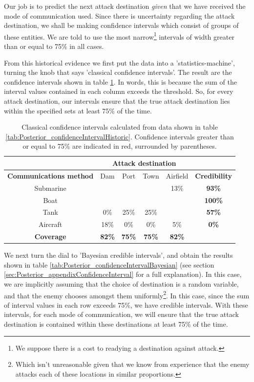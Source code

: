 \documentclass[11pt,fullpage]{book}
\begin{document}
Our job is to predict the next attack destination \textit{given} that we have received the mode of communication used. Since there is uncertainty regarding the attack destination, we shall be making confidence intervals which consist of groups of these entities. We are told to use the most narrow\footnote{We suppose there is a cost to readying a destination against attack.} intervals of width greater than or equal to 75\% in all cases.

From this historical evidence we first put the data into a 'statistics-machine', turning the knob that says 'classical confidence intervals'. The result are the confidence intervals shown in table \ref{tab:Posterior_confidenceIntervalClassical}. In words, this is because the sum of the interval values contained in each column exceeds the threshold. So, for every attack destination, our intervals ensure that the true attack destination lies within the specified sets at least 75\% of the time.

\begin{table}[htbp]
  \centering
    \begin{tabular}{cccccc}
    \toprule
          & \multicolumn{4}{c}{\textbf{Attack destination}} & \multicolumn{1}{c}{\textbf{}} \\
    \midrule
    \textbf{Communications method} & Dam & Port & Town & Airfield   & \textbf{Credibility} \\
    Submarine & \color{red}{$[$73\%}  & \color{red}{50\%}  & \color{red}{50\%$]$}  & 13\%  & \textbf{93\%} \\
    Boat  & \color{red}{$[$9\%}   & \color{red}{25\%}  & \color{red}{25\%}  & \color{red}{16\%$]$}  & \textbf{100\%} \\
    Tank  & 0\%   & 25\%  & 25\%  & \color{red}{$[$66\%$]$}  & \textbf{57\%} \\
    Aircraft & 18\%   & 0\%  & 0\%   & 5\%   & \textbf{0\%} \\
    \bottomrule
    \textbf{Coverage} & \textbf{82\%}  & \textbf{75\%}  & \textbf{75\%}  & \textbf{82\%} &  \\
    \end{tabular}%
  \caption{Classical confidence intervals calculated from data shown in table \ref{tab:Posterior_confidenceIntervalHistoric}. Confidence intervals greater than or equal to 75\% are indicated in red, surrounded by parentheses.}\label{tab:Posterior_confidenceIntervalClassical}%
\end{table}%

We next turn the dial to 'Bayesian credible intervals', and obtain the results shown in table \ref{tab:Posterior_confidenceIntervalBayesian} (see section \ref{sec:Posterior_appendixConfidenceInterval} for a full explanation). In this case, we are implicitly assuming that the choice of destination is a random variable, and that the enemy chooses amongst them uniformly\footnote{Which isn't unreasonable given that we know from experience that the enemy attacks each of these locations in similar proportions.}. In this case, since the sum of interval values in each row exceeds 75\%, we have credible intervals. With these intervals, for each mode of communication, we will ensure that the true attack destination is contained within these destinations at least 75\% of the time.
\end{document}
